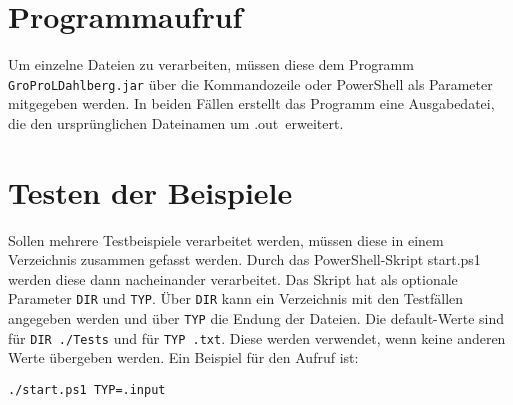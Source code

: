 \clearpage
\section{Programmaufruf}
\label{sec:Programmaufruf}
Um einzelne Dateien zu verarbeiten, müssen diese dem Programm \lstinline{GroProLDahlberg.jar} über die Kommandozeile oder PowerShell als Parameter mitgegeben werden. In beiden Fällen erstellt das Programm eine Ausgabedatei, die den ursprünglichen Dateinamen um \glqq .out\grqq\ erweitert.

\section{Testen der Beispiele}
Sollen mehrere Testbeispiele verarbeitet werden, müssen diese in einem Verzeichnis zusammen gefasst werden. Durch das PowerShell-Skript {start.ps1} werden diese dann nacheinander verarbeitet. Das Skript hat als optionale Parameter \lstinline{DIR} und \lstinline{TYP}. Über \lstinline{DIR} kann ein Verzeichnis mit den Testfällen angegeben werden und über \lstinline{TYP} die Endung der Dateien. Die default-Werte sind für \lstinline{DIR ./Tests} und für \lstinline{TYP .txt}. Diese werden verwendet, wenn keine anderen Werte übergeben werden. Ein Beispiel für den Aufruf ist:

\lstinline{./start.ps1 TYP=.input}
\cleardoublepage